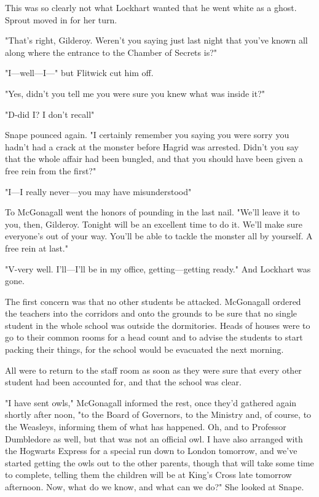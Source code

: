 This was so clearly not what Lockhart wanted that he went white as a ghost. Sprout moved in for her turn.

"That's right, Gilderoy. Weren't you saying just last night that you've known all along where the entrance to the Chamber of Secrets is?"

"I—well—I—" but Flitwick cut him off.

"Yes, didn't you tell me you were sure you knew what was inside it?"

"D-did I? I don't recall{\el}"

Snape pounced again. "I certainly remember you saying you were sorry you hadn't had a crack at the monster before Hagrid was arrested. Didn't you say that the whole affair had been bungled, and that you should have been given a free rein from the first?"

"I—I really never—you may have misunderstood{\el}"

To McGonagall went the honors of pounding in the last nail. "We'll leave it to you, then, Gilderoy. Tonight will be an excellent time to do it. We'll make sure everyone's out of your way. You'll be able to tackle the monster all by yourself. A free rein at last."

"V-very well. I'll—I'll be in my office, getting—getting ready." And Lockhart was gone.

The first concern was that no other students be attacked. McGonagall ordered the teachers into the corridors and onto the grounds to be sure that no single student in the whole school was outside the dormitories. Heads of houses were to go to their common rooms for a head count and to advise the students to start packing their things, for the school would be evacuated the next morning.

All were to return to the staff room as soon as they were sure that every other student had been accounted for, and that the school was clear.

"I have sent owls," McGonagall informed the rest, once they'd gathered again shortly after noon, "to the Board of Governors, to the Ministry and, of course, to the Weasleys, informing them of what has happened. Oh, and to Professor Dumbledore as well, but that was not an official owl. I have also arranged with the Hogwarts Express for a special run down to London tomorrow, and we've started getting the owls out to the other parents, though that will take some time to complete, telling them the children will be at King's Cross late tomorrow afternoon. Now, what do we know, and what can we do?" She looked at Snape.


